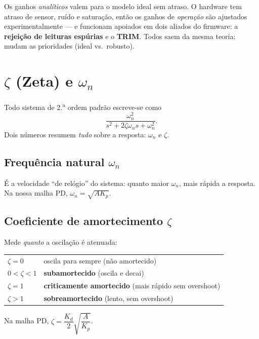 \begin{intuicao}
Os ganhos \emph{anal\'iticos} valem para o modelo ideal sem atraso. O hardware tem
atraso de sensor, ru\'ido e satura\c{c}\~ao, ent\~ao os ganhos de \emph{opera\c{c}\~ao}
s\~ao ajustados experimentalmente --- e funcionam apoiados em dois aliados do
firmware: a \textbf{rejei\c{c}\~ao de leituras esp\'urias} e o \textbf{TRIM}. Todos
saem da mesma teoria; mudam as prioridades (ideal vs.\ robusto).
\end{intuicao}

\chapter{$\zeta$ (Zeta) e $\omega_n$}\label{cap:zeta}

Todo sistema de 2.\textsuperscript{a} ordem padr\~ao escreve-se como
\begin{equation}
\frac{\omega_n^2}{s^2+2\zeta\omega_n s+\omega_n^2}.
\end{equation}
Dois n\'umeros resumem \emph{tudo} sobre a resposta: $\omega_n$ e $\zeta$.

\section{Frequ\^encia natural $\omega_n$}
\'E a velocidade ``de rel\'ogio'' do sistema: quanto maior $\omega_n$, mais
r\'apida a resposta. Na nossa malha PD, $\omega_n=\sqrt{A K_p}$.

\section{Coeficiente de amortecimento $\zeta$}
Mede \emph{quanto} a oscila\c{c}\~ao \'e atenuada:
\begin{center}
\begin{tabular}{ll}
$\zeta=0$ & oscila para sempre (n\~ao amortecido) \\
$0<\zeta<1$ & \textbf{subamortecido} (oscila e decai) \\
$\zeta=1$ & \textbf{criticamente amortecido} (mais r\'apido sem overshoot) \\
$\zeta>1$ & \textbf{sobreamortecido} (lento, sem overshoot) \\
\end{tabular}
\end{center}
Na malha PD, $\zeta=\dfrac{K_d}{2}\sqrt{\dfrac{A}{K_p}}$.

